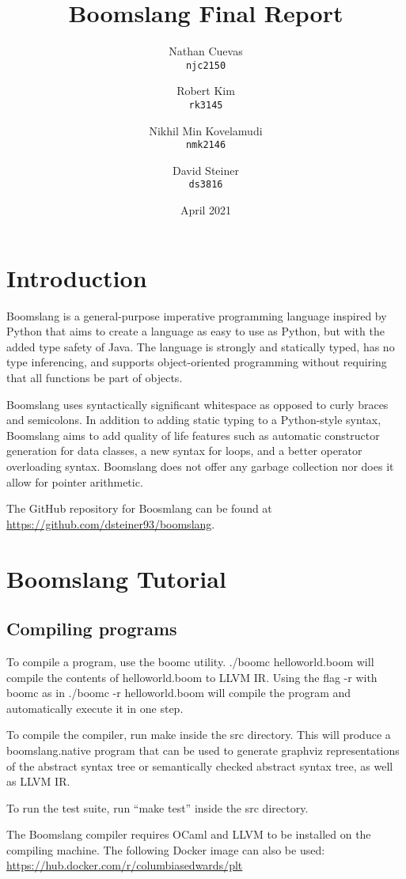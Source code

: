 \documentclass{article}
\title{Boomslang Final Report}
\author{
Nathan Cuevas\\
\texttt{njc2150} 
\and
Robert Kim\\
\texttt{rk3145} \and
Nikhil Min Kovelamudi \\
\texttt{nmk2146} \and
David Steiner \\
\texttt{ds3816}
}
\date{April 2021}
\begin{document}
\maketitle
\tableofcontents

\section{Introduction}
Boomslang is a general-purpose imperative programming language inspired by Python that aims to create a language as easy to use as Python, but with the added type safety of Java. The language is strongly and statically typed, has no type inferencing, and supports object-oriented programming without requiring that all functions be part of objects.

Boomslang uses syntactically significant whitespace as opposed to curly braces and semicolons. In addition to adding static typing to a Python-style syntax, Boomslang aims to add quality of life features such as automatic constructor generation for data classes, a new syntax for loops, and a better operator overloading syntax. Boomslang does not offer any garbage collection nor does it allow for pointer arithmetic.

The GitHub repository for Boosmlang can be found at \href{https://github.com/dsteiner93/boomslang}{https://github.com/dsteiner93/boomslang}.

\section{Boomslang Tutorial}
\subsection{Compiling programs}
To compile a program, use the boomc utility. ./boomc helloworld.boom will compile the contents of helloworld.boom to LLVM IR. Using the flag -r with boomc as in ./boomc -r helloworld.boom will compile the program and automatically execute it in one step.

To compile the compiler, run make inside the src directory. This will produce a boomslang.native program that can be used to generate graphviz representations of the abstract syntax tree or semantically checked abstract syntax tree, as well as LLVM IR.

To run the test suite, run ``make test'' inside the src directory.

The Boomslang compiler requires OCaml and LLVM to be installed on the compiling machine. The following Docker image can also be used: \href{https://hub.docker.com/r/columbiasedwards/plt}{https://hub.docker.com/r/columbiasedwards/plt}
\end{document}
